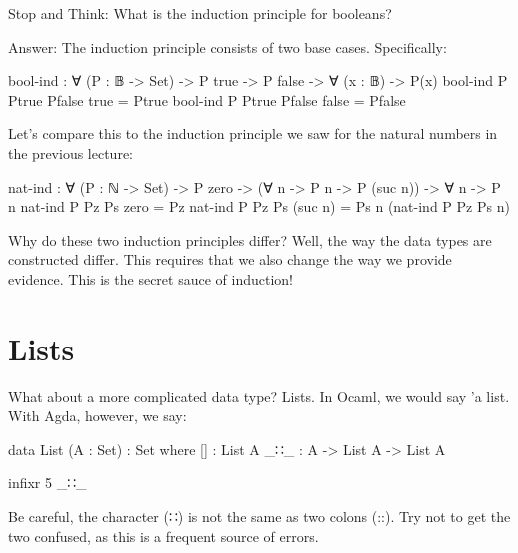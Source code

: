 \documentclass{lecturenotes}
\newcommand{\agdacons}{\textsf{∷}\xspace}
\begin{document}
\noindent Stop and Think: What is the induction principle for booleans?

\noindent Answer: The induction principle consists of two base cases. Specifically: 

\begin{center}
    \begin{code}
        bool-ind : ∀ (P : 𝔹 -> Set) -> P true -> P false -> ∀ (x : 𝔹) -> P(x)
        bool-ind P Ptrue Pfalse true = Ptrue 
        bool-ind P Ptrue Pfalse false = Pfalse
    \end{code}
\end{center}

\vspace{0.2in}

\noindent Let's compare this to the induction principle we saw for the natural numbers in the previous lecture: 

\begin{center}
    \begin{code}
        nat-ind : ∀ (P : ℕ -> Set) -> P zero -> (∀ n -> P n -> P (suc n)) -> ∀ n -> P n
        nat-ind P Pz Ps zero = Pz
        nat-ind P Pz Ps (suc n) = Ps n (nat-ind P Pz Ps n)
    \end{code}
\end{center}

Why do these two induction principles differ? 
Well, the way the data types are constructed differ.
This requires that we also change the way we provide evidence.
This is the secret sauce of induction!

\vspace{0.2in}

\section{Lists}
\label{sec:list-types}

What about a more complicated data type? Lists.
In Ocaml, we would say \textsf{'a list}. With Agda, however, we say:

\begin{center}
    \begin{code}
        data List (A : Set) : Set where
            [] : List A
            _∷_ : A -> List A -> List A

        infixr 5 _∷_
    \end{code}
\end{center}

\pagebreak

Be careful, the character (\agdacons) is not the same as two colons (::).
Try not to get the two confused, as this is a frequent source of errors.
\end{document}

